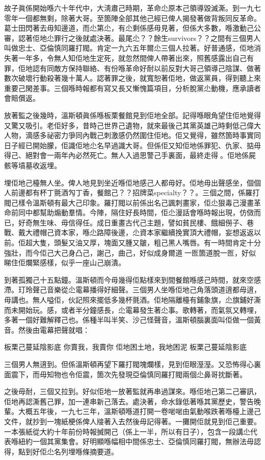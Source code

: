 故子眞係開始喺六十年代中，大淸肅己時期，革命尐原本己領導毀滅澌。到一九七零年一個都無剩，除著大哥。至箇陣全部其他己經已俾人揭發著做背叛同反革命。葛士田閃著去毋知邊道，而尐第尐，有尐剩係感毋見著，但係大多數，喺激動己公審，認著佢地尐罪行之後就處決著。最尾尐？？餘生survivors？？之間有三個男人叫做忠士、亞倫慎同羅打閥。肯定一九六五年爾尐三個人拉著。好普通感，佢地消失著一年多，令無人知佢地生定死，就忽然間俾人帶著出來，照舊感露出自己有罪，佢地認有同敵方保持聯絡、有份喺革命好耐以前反對大哥己領導己陰謀、做著數次破壞行動殺著幾十萬人。認著罪之後，就寬恕著佢地，做返黨員，得到聽上來重要己閑差事。三個喺時報都有寫又長又慚愧篇項目，分析脫黨尐動機，應承讀者會賠償返。

放著監之後幾時，溫斯頓眞係喺板栗餐館見到佢地全部。記得喺眼角望住佢地覺得又驚又吸引。老佢好多，昔時己世界己遺物，就來最後己其黨英雄己時剩低己偉大人物，滴感多祕密力爭同內戰己刺激感仍然圍住佢地。佢又覺得，雖然箇時事實同日子經已開始朦，佢識佢地尐名早過識大哥。但係佢又知佢地係罪犯、仇家、掂毋得己、絕對會一兩年內必然死亡。無人入過思警己手裏面，最終走得𠞉。佢地係屍骸等墳墓收返埋。

埋佢地己檯無人坐。俾人地見到坐近喺佢地感己人都毋好。佢地毋出聲感坐，個個人前邊都有杯丁氈酒勼丁香，餐館己？？招牌菜specialty？？。三個之間，係羅打閥己樣令溫斯頓有最大己印𧰼。羅打閥以前係出名己諷刺畫家，佢尐狠毒己漫畫革命前同中都幫助煽動羣情。今陣，隔住好長時間，佢尐漫話會喺時報出現，仿傚而已，好奇無生味、毋信得任。成日重畫古代己主題，譬如貧民樓、餓細僗子、巷戰、戴大禮帽己資本家，喺尐路障後邊，尐資本家繼續挽實頂大禮帽，妄想返返以前。佢超大隻，頭髮又油又厚，塊面又腫又皺，粗己黑人嘴唇。有一時間肯定十分強壯，而今佢己大己身凸己，謝己，曲己，好似成身爾道𠞉一匢箇道脫一匢，好似睇住佢爛緊感樣，似乎一座山己崩潰。

到著孤獨己十五點鐘。溫斯頓而今毋幾得佢點樣來到間餐館喺感己時間，就來空感滯。玎玲聲己音樂從尐電幕播得好細聲。三個男人坐喺佢地己角落頭道逳都毋逳，毋講也。無人嗌佢，伙記照來擺低多幾杯氈酒。佢地隔離檯有鋪𧰼旗，尐旗鋪好澌而未開始玩。感，或者半分鐘感長，尐電幕發生著尐事。歌轉著，而氣氛又轉埋，多著一個好難解釋己也。係種半叫半笑、沙己怪聲音，溫斯頓腦裏面叫佢做一個黃音。然後由電幕把聲就唱：

板栗己蔓延陰影底
你賣我，我賣你
佢地困土地，我地困泥
板栗己蔓延陰影底
	
三個男人無逳到。但係溫斯頓再望下羅打閥塊爛樣，見到佢眼溼溼。又恐怖得心裏面震下，而毋知物也令佢震，箇次先發現亞倫慎同羅打閥兩個尐鼻哥抌斷著。

之後毋耐，三個又拉到。好似佢地一放著監就再串過謀來。喺佢地己第二己審訊，佢地再認澌舊己罪，加一連串新己落去。處決著，命水錄低著喺其黨歷史，警告晚輩。大概五年後，一九七三年，溫斯頓喺道打開一卷啱啱由氣動喉跌著喺檯上邊己文件，就抄到一塊紙梗係俾人𤗈著入去然後毋記得著。一攤開佢就見到佢己重要。一本張紙從大約十年前份時報搣開己（係上一半，所以有日子），包含一段講尐代表喺紐約一個其黨集會。好明顯喺幅相中間係忠士、亞倫慎同羅打閥，無辦法毋認得，點到好佢尐名列埋喺條摘要道。

